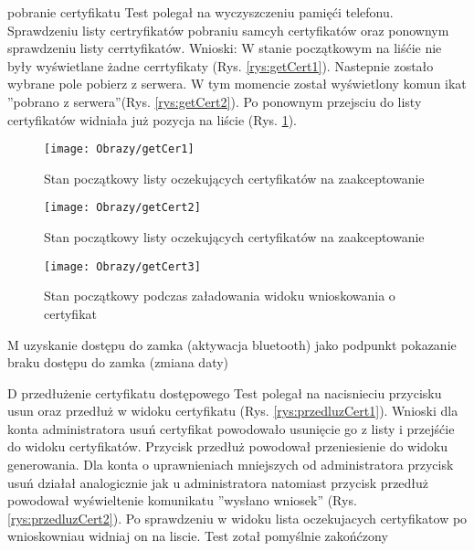 \begin{enumerate*}
\begin{figure}[ht!]
\end{figure}
	
	
	\item   pobranie certyfikatu
	Test polegał na wyczyszczeniu pamięći telefonu. Sprawdzeniu listy certryfikatów pobraniu samcyh certyfikatów oraz ponownym sprawdzeniu listy cerrtyfikatów.
	Wnioski: W stanie początkowym na liśćie nie były wyświetlane żadne cerrtyfikaty (Rys. \ref{rys:getCert1}). Nastepnie zostało wybrane pole pobierz z serwera. W tym momencie został wyświetlony komun ikat ''pobrano z serwera''(Rys. \ref{rys:getCert2}). Po ponownym przejsciu do listy certyfikatów widniała już pozycja na liście (Rys. \ref{rys:getCert3}).
	
		\begin{figure}[ht!]
		
		\begin{minipage}{0.2\textwidth}
			\texttt{[image: Obrazy/getCer1]}
			\caption{Stan początkowy listy oczekujących certyfikatów na zaakceptowanie }
			\label{rys:getCert1}
		\end{minipage}
		
		\begin{minipage}{0.2\textwidth}
			\texttt{[image: Obrazy/getCert2]}
			\caption{Stan początkowy listy oczekujących certyfikatów na zaakceptowanie }
			\label{rys:getCert2}
		\end{minipage}
		
		
		\begin{minipage}{0.2\textwidth}
			\texttt{[image: Obrazy/getCert3]}
			\caption{Stan początkowy podczas załadowania widoku wnioskowania o certyfikat}
			\label{rys:getCert3}
		\end{minipage}
		
	
	\end{figure}
	
	
	\item M uzyskanie dostępu do zamka (aktywacja bluetooth)
		 jako podpunkt pokazanie braku dostępu do zamka (zmiana daty)
	\item D przedłużenie certyfikatu dostępowego
	Test polegał na nacisnieciu przycisku usun oraz przedłuż w widoku certyfikatu (Rys. \ref{rys:przedluzCert1}).
	Wnioski dla konta administratora usuń certyfikat powodowało usunięcie go z listy i przejśćie do widoku certyfikatów. Przycisk przedłuż powodował przeniesienie do widoku generowania. Dla konta o uprawnieniach  mniejszych od administratora przycisk usuń działał analogicznie jak u administratora natomiast przycisk przedłuż powodował wyświeltenie komunikatu ''wysłano wniosek'' (Rys. \ref{rys:przedluzCert2}).
	Po sprawdzeniu w widoku lista oczekujacych certyfikatow po wnioskowniau widniaj on na liscie. Test zotał pomyślnie zakońćzony
	

\end{enumerate*}
